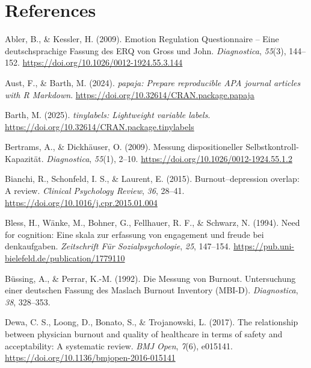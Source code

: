 \documentclass[
  man]{apa6}
\newlength{\cslhangindent}
\newenvironment{CSLReferences}[2] %
 {\begin{list}{}{%
  \setlength{\itemindent}{0pt}
  \setlength{\leftmargin}{0pt}
  \setlength{\parsep}{0pt}
  \ifodd #1
   \setlength{\leftmargin}{\cslhangindent}
   \setlength{\itemindent}{-1\cslhangindent}
  \fi
  \setlength{\itemsep}{#2\baselineskip}}}
 {\end{list}}
\begin{document}
\newpage

\section{References}\label{references}

\label{refs}
\begin{CSLReferences}{1}{0}
Abler, B., \& Kessler, H. (2009). {Emotion Regulation Questionnaire -- Eine deutschsprachige Fassung des ERQ von Gross und John}. \emph{Diagnostica}, \emph{55}(3), 144--152. \url{https://doi.org/10.1026/0012-1924.55.3.144}

Aust, F., \& Barth, M. (2024). \emph{{papaja}: {Prepare} reproducible {APA} journal articles with {R Markdown}}. \url{https://doi.org/10.32614/CRAN.package.papaja}

Barth, M. (2025). \emph{{tinylabels}: Lightweight variable labels}. \url{https://doi.org/10.32614/CRAN.package.tinylabels}

Bertrams, A., \& Dickhäuser, O. (2009). {Messung dispositioneller Selbstkontroll-Kapazität}. \emph{Diagnostica}, \emph{55}(1), 2--10. \url{https://doi.org/10.1026/0012-1924.55.1.2}

Bianchi, R., Schonfeld, I. S., \& Laurent, E. (2015). Burnout--depression overlap: A review. \emph{Clinical Psychology Review}, \emph{36}, 28--41. \url{https://doi.org/10.1016/j.cpr.2015.01.004}

Bless, H., Wänke, M., Bohner, G., Fellhauer, R. F., \& Schwarz, N. (1994). Need for cognition: Eine skala zur erfassung von engagement und freude bei denkaufgaben. \emph{Zeitschrift Für Sozialpsychologie}, \emph{25}, 147--154. \url{https://pub.uni-bielefeld.de/publication/1779110}

Büssing, A., \& Perrar, K.-M. (1992). Die {Messung von Burnout. Untersuchung einer deutschen Fassung des Maslach Burnout Inventory (MBI-D)}. \emph{Diagnostica}, \emph{38}, 328--353.

Dewa, C. S., Loong, D., Bonato, S., \& Trojanowski, L. (2017). The relationship between physician burnout and quality of healthcare in terms of safety and acceptability: A systematic review. \emph{BMJ Open}, \emph{7}(6), e015141. \url{https://doi.org/10.1136/bmjopen-2016-015141}


\end{CSLReferences}
\end{document}
